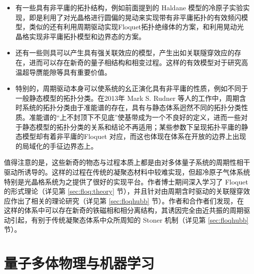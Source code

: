 \begin{itemize}

\item 有一些具有非平庸的拓扑结构，例如前面提到的 Haldane 模型的冷原子实验实现\cite{haldane-expr-2014}，即是利用了对光晶格进行圆偏的晃动来实现带有非平庸拓扑的有效频闪模型\cite{oka2009}，类似的还有利用周期驱动实现Floquet拓扑绝缘体的方案\cite{floq-ti-2011}，和利用晃动光晶格实现非平庸拓扑模型和边界态的方案\cite{zhengwei-floquet-2014}。

\item 还有一些则具可以产生具有强关联效应的模型，产生出如关联隧穿效应的存在\cite{correlated-tunnel-expr-2018-shaking,correlated-tunnel-expr-2018-raman}，进而可以存在新奇的量子相结构和相变过程\cite{floqhubb}。这样的有效模型对于研究高温超导赝能隙等具有重要价值。

\item 特别的，周期驱动本身可以使系统的幺正演化具有非平庸的性质，例如不同于一般静态模型的拓扑分类\cite{floq-edgestate-2013-prx}。在2013年 Mark S. Rudner 等人的工作中，周期含时系统的拓扑分类由于准能谱的存在，具有与静态体系迥然不同的拓扑分类性质。准能谱的“上不封顶下不见底”使基带成为一个不良好的定义，进而一些对于静态模型的拓扑分类\cite{topoclassify2016}的关系和结论不再适用；某些参数下呈现拓扑平庸的静态模型却有着非平庸的Floquet 对应，而这也体现在体系在开放的边界上出现的局域化的手征边界态上。

\end{itemize}

值得注意的是，这些新奇的物态与过程本质上都是由对多体量子系统的周期性相干驱动所诱导的。这样的过程在传统的凝聚态材料中较难实现，但超冷原子气体系统特别是光晶格系统为之提供了很好的实现平台。作者博士期间深入学习了 Floquet 的形式理论（详见第 \ref{sec:floq:theory} 节），并且针对由周期含时驱动的关联隧穿效应作出了相关的理论研究\cite{floqhubb}（详见第 \ref{sec:floqhubb} 节）。作者和合作者们发现，在这样的体系中可以存在新奇的铁磁相和相分离结构，其诱因完全由近共振的周期驱动引起，有别于传统凝聚态体系中众所周知的 Stoner 机制（详见第 \ref{sec:floqhubb} 节）。





\section{量子多体物理与机器学习}

